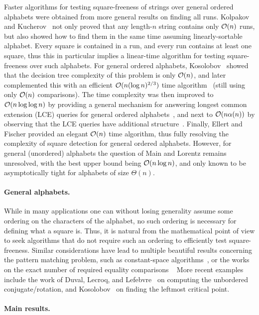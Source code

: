 Faster algorithms for testing square-freeness of strings over general ordered alphabets  were obtained from more general results on finding all runs. Kolpakov and Kucherov~\cite{Kolpakov1999} not only proved that any length-$n$
string contains only $\mathcal{O}(n)$ runs, but also showed how to find them in the same time assuming
linearly-sortable alphabet. Every square is contained in a run, and every run contains at least one square, thus this
in particular implies a linear-time algorithm for testing square-freeness over such alphabets. For general ordered alphabets,
Kosolobov~\cite{Kosolobov2015} showed that the decision tree complexity of this problem is only $\mathcal{O}(n)$, and later complemented this with an efficient $\mathcal{O}(n(\log n)^{2/3})$ time algorithm~\cite{Kosolobov2016}
(still using only $\mathcal{O}(n)$ comparisons). The time complexity was then improved to $\mathcal{O}(n\log\log n)$ by providing a general
mechanism for answering longest common extension (LCE) queries for general ordered alphabets~\cite{Gawrychowski2016},
and next to $\mathcal{O}(n\alpha(n))$ by observing that the LCE queries have additional structure~\cite{CrochemoreIKKPR16}.
Finally, Ellert and Fischer provided an elegant $\mathcal{O}(n)$ time algorithm, thus fully resolving the complexity of square detection
for general ordered alphabets. However, for general (unordered) alphabets the question of Main and Lorentz remains
unresolved, with the best upper bound being $\mathcal{O}(n\log n)$, and only known to be asymptotically tight for alphabets of
size $\Theta(n)$.

\paragraph{General alphabets.} While in many applications one can without losing generality assume some
ordering on the characters of the alphabet, no such ordering is necessary for defining what a square is. Thus, it is natural
from the mathematical point of view to seek algorithms that do not require such an ordering to efficiently test square-freeness.
Similar considerations have lead to multiple beautiful results concerning the pattern matching problem, such as constant-space algorithms~\cite{GALIL1983280,Breslauer1992},
or the works on the exact number of required equality comparisons ~\cite{Cole1997} 
 More recent examples include the work of Duval, Lecroq, and Lefebvre~\cite{Duval2014}
on computing the unbordered conjugate/rotation, and Kosolobov~\cite{Kosolobov2016a} on finding the leftmost critical point.

\paragraph{Main results.}

